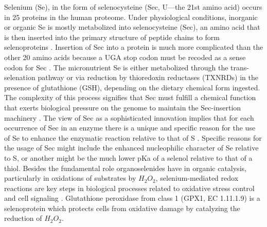 \documentclass[journal=jacsat,manuscript=article]{achemso}
\begin{document}
Selenium (Se), in the form of selenocysteine (Sec, U—the 21st amino acid) occurs in 25 proteins in the human proteome. Under physiological conditions, inorganic or organic Se is mostly metabolized into selenocysteine (Sec), an amino acid that is then inserted into the primary structure of peptide chains to form selenoproteins \cite{}. Insertion of Sec into a protein is much more complicated than the other 20 amino acids because a UGA stop codon must be recoded as a sense codon for Sec \cite{hondal_differing_2011}. The micronutrient Se is either metabolized through the trans-selenation pathway or via reduction by thioredoxin reductases (TXNRDs) in the presence of glutathione (GSH), depending on the dietary chemical form ingested\cite{}.  The complexity of this process signifies that Sec must fulfill a chemical function that exerts biological pressure on the genome to maintain the Sec-insertion machinery \cite{hondal_differing_2011,cardey_selenocysteine_2007}. The view of Sec as a sophisticated innovation implies that for each occurrence of Sec in an enzyme there is a unique and specific reason for the use of Se to enhance the enzymatic reaction relative to that of S \cite{hondal_differing_2011}. Specific reasons for the usage of Sec might include the enhanced nucleophilic character of Se relative to S, or another might be the much lower pKa of a selenol relative to that of a thiol\cite{hondal_differing_2011}. Besides the fundamental role organoselenides have in organic catalysis, particularly in oxidations of substrates by $H_{2} O_{2}$, selenium-mediated redox reactions are key steps in biological processes related to oxidative stress control and cell signaling \cite{14}. Glutathione peroxidase from class 1 (GPX1, EC 1.11.1.9) is a selenoprotein which protects cells from oxidative damage by catalyzing the reduction of $H_{2} O_{2}$.
\end{document}
